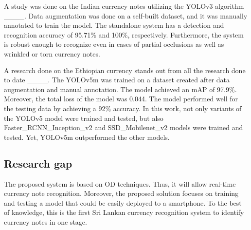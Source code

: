 A study was done on the Indian currency notes utilizing the YOLOv3 algorithm ____. Data augmentation was done on a self-built dataset, and it was manually annotated to train the model. The standalone system has a detection and recognition accuracy of 95.71\% and 100\%, respectively. Furthermore, the system is robust enough to recognize even in cases of partial occlusions as well as wrinkled or torn currency notes.

A research done on the Ethiopian currency stands out from all the research done to date ____. The YOLOv5m was trained on a dataset created after data augmentation and manual annotation. The model achieved an mAP of 97.9\%. Moreover, the total loss of the model was 0.044. The model performed well for the testing data by achieving a 92\% accuracy. In this work, not only variants of the YOLOv5 model were trained and tested, but also Faster\_RCNN\_Inception\_v2 and SSD\_Mobilenet\_v2 models were trained and tested. Yet, YOLOv5m outperformed the other models.

\subsection{Research gap}
The proposed system is based on OD techniques. Thus, it will allow real-time currency note recognition. Moreover, the proposed solution focuses on training and testing a model that could be easily deployed to a smartphone. To the best of knowledge, this is the first Sri Lankan currency recognition system to identify currency notes in one stage.

\vspace{0.15cm}